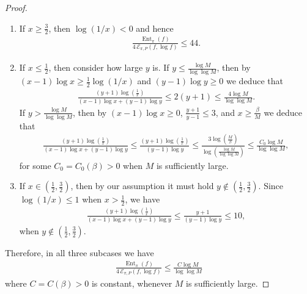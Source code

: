 \documentclass[11pt]{article}
\def\cE{\mathcal{E}}
\DeclareMathOperator\Ent{\mathrm{Ent}}
\theoremstyle{definition}
\begin{document}
\begin{proof}
\begin{enumerate}[label=(\roman*)]
  \item If $x \ge \frac{3}{2}$, then $\log(1/x) < 0$ and hence
  \begin{align}
  \frac{\Ent_\pi(f)}{4\, \cE_{\pi,P}(f,\log f)}
  \le 44.
  \end{align}

  \item If $x \le \frac{1}{2}$, then consider how large $y$ is.
  If $y \le \frac{\log M}{\log\log M}$, then by $(x-1)\log x \ge \frac{1}{2} \log(1/x)$ and $(y-1)\log y \ge 0$ we deduce that
  \begin{align}
  \frac{(y+1) \log\left( \frac{1}{x} \right)}{(x-1)\log x + (y-1) \log y} \le 2(y+1)
  \le \frac{4\log M}{\log\log M}.
  \end{align}
  If $y > \frac{\log M}{\log\log M}$, then by $(x-1)\log x \ge 0$, $\frac{y+1}{y-1} \le 3$, and $x \ge \frac{\beta}{M}$ we deduce that
  \begin{align}
  \frac{(y+1) \log\left( \frac{1}{x} \right)}{(x-1)\log x + (y-1) \log y}
  \le \frac{(y+1) \log\left( \frac{1}{x} \right)}{(y-1) \log y}
  \le \frac{3 \log(\frac{M}{\beta})}{\log (\frac{\log M}{\log\log M})}
  \le \frac{C_0\log M}{\log\log M},
  \end{align}
  for some $C_0 = C_0(\beta) > 0$ when $M$ is sufficiently large.

  \item If $x \in (\frac{1}{2},\frac{3}{2})$, then by our assumption it must hold $y \notin (\frac{1}{2},\frac{3}{2})$.
  Since $\log(1/x) \le 1$ when $x > \frac{1}{2}$, we have
  \begin{align}
  \frac{(y+1) \log\left( \frac{1}{x} \right)}{(x-1)\log x + (y-1) \log y}
  \le \frac{y+1}{(y-1) \log y}
  \le 10,
  \end{align}
  when $y \notin (\frac{1}{2},\frac{3}{2})$.
\end{enumerate}

Therefore, in all three subcases we have
\begin{align}
\frac{\Ent_\pi(f)}{4\, \cE_{\pi,P}(f,\log f)}
\le \frac{C\log M}{\log\log M}
\end{align}
where $C = C(\beta) > 0$ is constant, whenever $M$ is sufficiently large.


\end{proof}
\end{document}
